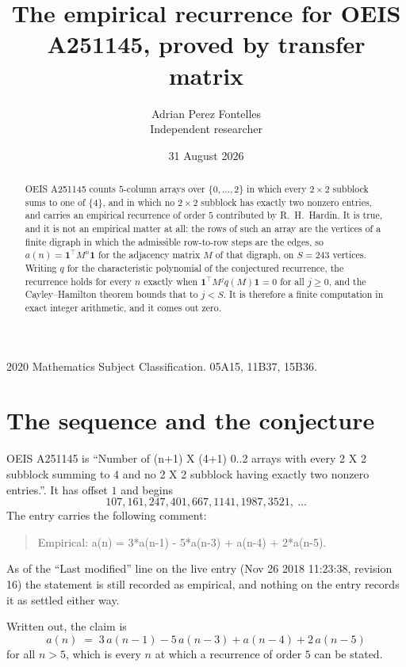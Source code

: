 \documentclass[11pt,a4paper]{article}
\title{The empirical recurrence for OEIS A251145, proved by transfer matrix}
\author{Adrian Perez Fontelles\\ \small Independent researcher}
\date{31 August 2026}
\theoremstyle{plain}
\theoremstyle{definition}
\begin{document}
\maketitle

\begin{abstract}
OEIS A251145 counts $5$-column arrays over $\{0,\dots,2\}$ in which every
$2\times2$ subblock sums to one of $\{4\}$, and in which no $2\times2$ subblock has exactly two nonzero entries, and carries an empirical
recurrence of order $5$ contributed by R.~H.~Hardin. It is true, and it is not an
empirical matter at all: the rows of such an array are the vertices of a finite digraph in
which the admissible row-to-row steps are the edges, so $a(n)=\mathbf{1}^{\!\top}M^{n}
\mathbf{1}$ for the adjacency matrix $M$ of that digraph, on $S=243$ vertices. Writing
$q$ for the characteristic polynomial of the conjectured recurrence, the recurrence holds
for every $n$ exactly when $\mathbf{1}^{\!\top}M^{j}q(M)\mathbf{1}=0$ for all
$j\ge0$, and the Cayley--Hamilton theorem bounds that to $j<S$. It is therefore a finite
computation in exact integer arithmetic, and it comes out zero.
\end{abstract}

\noindent\small 2020 Mathematics Subject Classification. 05A15, 11B37, 15B36.\normalsize

\section{The sequence and the conjecture}

OEIS A251145 is ``Number of (n+1) X (4+1) 0..2 arrays with every 2 X 2 subblock summing to 4 and no 2 X 2 subblock having exactly two nonzero entries.''. It has offset $1$
and begins
\[
107, 161, 247, 401, 667, 1141, 1987, 3521,\ \dots
\]
The entry carries the following comment:
\begin{quote}\small
Empirical: a(n) = 3*a(n-1) - 5*a(n-3) + a(n-4) + 2*a(n-5).
\end{quote}
As of the ``Last modified'' line on the live entry (Nov 26 2018 11:23:38, revision 16) the statement is
still recorded as empirical, and nothing on the entry records it as settled either way.

Written out, the claim is
\begin{equation}\label{eq:conj}
a(n)\;=\;3\,a(n-1) - 5\,a(n-3) + a(n-4) + 2\,a(n-5)
\end{equation}
for all $n>5$, which is every $n$ at which a recurrence of order $5$ can be
stated.
\end{document}
